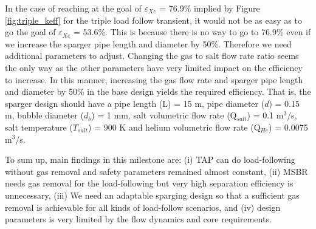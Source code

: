     In the case of reaching at the goal of $\varepsilon$$_{Xe}$ = 76.9\% implied
    by Figure \ref{fig:triple_keff} for the triple load follow transient, it
    would not be as easy as to go the goal of $\varepsilon$$_{Xe}$ = 53.6\%.
    This is because there is no way to go to 76.9\% even if we increase the
    sparger pipe length and diameter by 50\%. Therefore we need additional
    parameters to adjust. Changing the gas to salt flow rate ratio seems the
    only way as the other parameters have very limited impact on the efficiency to increase. In this manner, increasing the gas flow rate and sparger
    pipe length and diameter by 50\% in the base design yields the required
    efficiency. That is, the sparger design should have a pipe length (L) = 15
    m, pipe diameter ($d$) = 0.15 m, bubble diameter ($d_b$) = 1 mm, salt
    volumetric flow rate (Q$_{salt}$) = 0.1 m$^{3}$/s, salt temperature
    ($T_{salt}$) = 900 K and helium volumetric flow rate (Q$_{He}$) = 0.0075
    m$^{3}$/s.

    To sum up, main findings in this milestone are: (i) TAP can do
    load-following without gas removal and safety parameters remained almost
    constant, (ii) MSBR needs gas removal for the load-following but very high
    separation efficiency is unnecessary, (iii) We need an adaptable sparging
    design so that a sufficient gas removal is achievable for all kinds of
    load-follow scenarios, and (iv) design parameters is very limited by the flow dynamics and core requirements.

